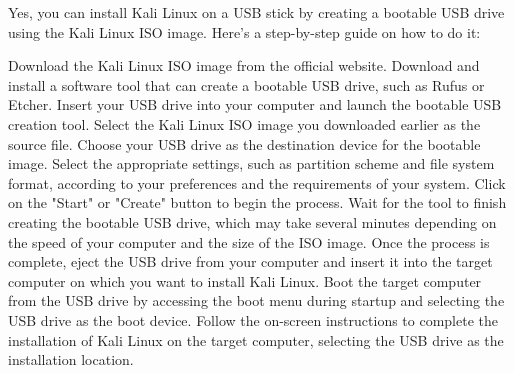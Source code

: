 Yes, you can install Kali Linux on a USB stick by creating a bootable USB drive using the Kali Linux ISO image. Here's a step-by-step guide on how to do it:

Download the Kali Linux ISO image from the official website.
Download and install a software tool that can create a bootable USB drive, such as Rufus or Etcher.
Insert your USB drive into your computer and launch the bootable USB creation tool.
Select the Kali Linux ISO image you downloaded earlier as the source file.
Choose your USB drive as the destination device for the bootable image.
Select the appropriate settings, such as partition scheme and file system format, according to your preferences and the requirements of your system.
Click on the "Start" or "Create" button to begin the process.
Wait for the tool to finish creating the bootable USB drive, which may take several minutes depending on the speed of your computer and the size of the ISO image.
Once the process is complete, eject the USB drive from your computer and insert it into the target computer on which you want to install Kali Linux.
Boot the target computer from the USB drive by accessing the boot menu during startup and selecting the USB drive as the boot device.
Follow the on-screen instructions to complete the installation of Kali Linux on the target computer, selecting the USB drive as the installation location.
